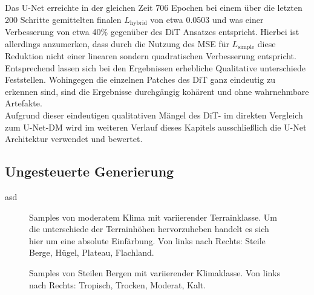 Das U-Net erreichte in der gleichen Zeit 706 Epochen bei einem über die letzten 200 Schritte gemittelten finalen $L_\text{hybrid}$ von etwa 0.0503 und was einer Verbesserung von etwa 40\% gegenüber des DiT Ansatzes entspricht. Hierbei ist allerdings anzumerken, dass durch die Nutzung des MSE für $L_\text{simple}$ diese Reduktion nicht einer linearen sondern quadratischen Verbesserung entspricht. Entsprechend lassen sich bei den Ergebnissen erhebliche Qualitative unterschiede Feststellen. Wohingegen die einzelnen Patches des DiT ganz eindeutig zu erkennen sind, sind die Ergebnisse durchgängig kohärent und ohne wahrnehmbare Artefakte. \\
Aufgrund dieser eindeutigen qualitativen Mängel des DiT- im direkten Vergleich zum U-Net-DM wird im weiteren Verlauf dieses Kapitels ausschließlich die U-Net Architektur verwendet und bewertet. 

\subsection {Ungesteuerte Generierung}

asd

\begin{figure}[htbp]
    \centering
    \caption{Samples von moderatem Klima mit variierender Terrainklasse. Um die unterschiede der Terrainhöhen hervorzuheben handelt es sich hier um eine absolute Einfärbung. Von links nach Rechts: Steile Berge, Hügel, Plateau, Flachland.}
    \label{fig:unc_terrain}
\end{figure}

\begin{figure}[htbp]
    \centering
    \caption{Samples von Steilen Bergen mit variierender Klimaklasse. Von links nach Rechts: Tropisch, Trocken, Moderat, Kalt.}
    \label{fig:unc_climate}
\end{figure}



